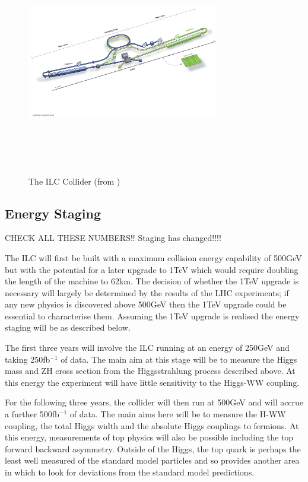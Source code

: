 \begin{figure}
  \centering
  \includegraphics[width=0.75\textwidth,height=10cm,keepaspectratio]{Experiments/fig/ILC}
  \caption[The ILC Experiment]{The \ac{ILC} Collider (from \cite{ILCTDR})}
  \label{Fig:ILC}
\end{figure}

\subsection{Energy Staging}
CHECK ALL THESE NUMBERS!! Staging has changed!!!!

The \ac{ILC} will first be built with a maximum collision energy capability of 500GeV but with the potential for a later upgrade to 1TeV which would require doubling the length of the machine to 62km. The decision of whether the 1TeV upgrade is necessary will largely be determined by the results of the \ac{LHC} experiments; if any new physics is discovered above 500GeV then the 1TeV upgrade could be essential to characterise them. Assuming the 1TeV upgrade is realised the energy staging will be as described below.

The first three years will involve the ILC running at an energy of 250GeV and taking 250fb${^{-1}}$ of data. The main aim at this stage will be to measure the Higgs mass and ZH cross section from the Higgsstrahlung process described above. At this energy the experiment will have little sensitivity to the Higgs-WW coupling.

For the following three years, the collider will then run at 500GeV and will accrue a further 500fb${^{-1}}$ of data. The main aims here will be to measure the H-WW coupling, the total Higgs width and the absolute Higgs couplings to fermions. At this energy, measurements of top physics will also be possible including the top forward backward asymmetry. Outside of the Higgs, the top quark is perhaps the least well measured of the standard model particles and so provides another area in which to look for deviations from the standard model predictions.

